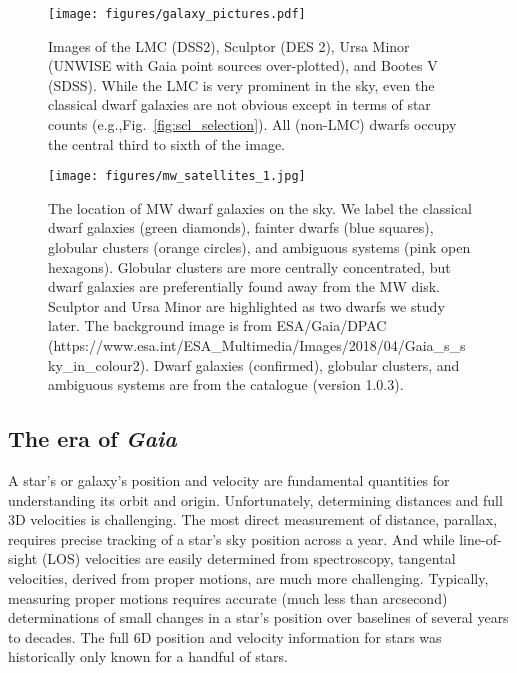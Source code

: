 \begin{figure}
\centering
\texttt{[image: figures/galaxy\_pictures.pdf]}
\caption[Dwarf Galaxy Pictures]{Images of the LMC (DSS2), Sculptor (DES
2), Ursa Minor (UNWISE with Gaia point sources over-plotted), and Bootes
V (SDSS). While the LMC is very prominent in the sky, even the classical
dwarf galaxies are not obvious except in terms of star counts
(e.g.,Fig.~\ref{fig:scl_selection}). All (non-LMC) dwarfs occupy the
central third to sixth of the image.}\label{fig:galaxy_images}
\end{figure}

\begin{figure}
\centering
\texttt{[image: figures/mw\_satellites\_1.jpg]}
\caption[Dwarf galaxies sky position]{The location of MW dwarf galaxies
on the sky. We label the classical dwarf galaxies (green diamonds),
fainter dwarfs (blue squares), globular clusters (orange circles), and
ambiguous systems (pink open hexagons). Globular clusters are more
centrally concentrated, but dwarf galaxies are preferentially found away
from the MW disk. Sculptor and Ursa Minor are highlighted as two dwarfs
we study later. The background image is from ESA/Gaia/DPAC
(https://www.esa.int/ESA\_Multimedia/Images/2018/04/Gaia\_s\_sky\_in\_colour2).
Dwarf galaxies (confirmed), globular clusters, and ambiguous systems are
from the \citet{pace2024} catalogue (version
1.0.3).}\label{fig:mw_satellite_system}
\end{figure}

\subsection{\texorpdfstring{The era of
\emph{Gaia}}{The era of Gaia}}\label{the-era-of-gaia}

A star's or galaxy's position and velocity are fundamental quantities
for understanding its orbit and origin. Unfortunately, determining
distances and full 3D velocities is challenging. The most direct
measurement of distance, parallax, requires precise tracking of a star's
sky position across a year. And while line-of-sight (LOS) velocities are
easily determined from spectroscopy, tangental velocities, derived from
proper motions, are much more challenging. Typically, measuring proper
motions requires accurate (much less than arcsecond) determinations of
small changes in a star's position over baselines of several years to
decades. The full 6D position and velocity information for stars was
historically only known for a handful of stars.


